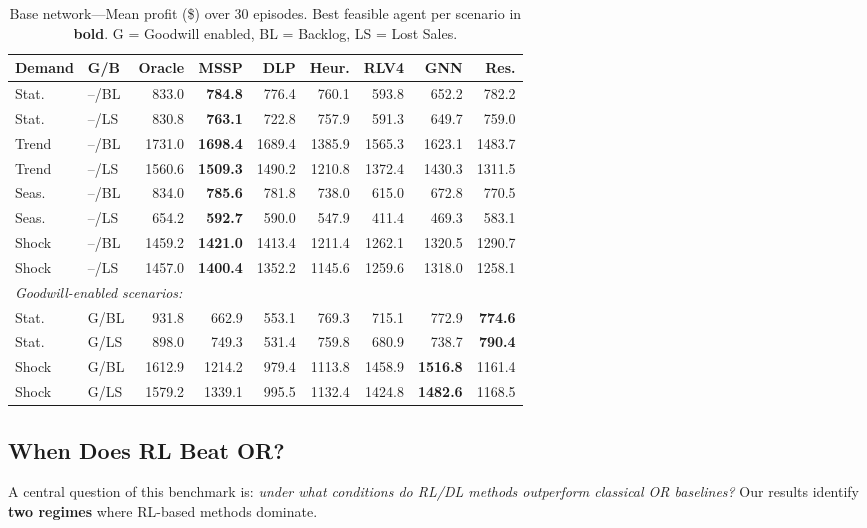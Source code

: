 \begin{table}[htbp]
\centering
\caption{Base network---Mean profit (\$) over 30 episodes. Best feasible
         agent per scenario in \textbf{bold}. G = Goodwill enabled,
         BL = Backlog, LS = Lost Sales.}
\label{tab:base_results}
\small
\begin{tabular}{ll rrrrrrr}
\toprule
\textbf{Demand} & \textbf{G/B}
  & \textbf{Oracle} & \textbf{MSSP} & \textbf{DLP} & \textbf{Heur.}
  & \textbf{RLV4} & \textbf{GNN} & \textbf{Res.} \\
\midrule
Stat. & --/BL & 833.0 & \textbf{784.8} & 776.4 & 760.1 & 593.8 & 652.2 & 782.2 \\
Stat. & --/LS & 830.8 & \textbf{763.1} & 722.8 & 757.9 & 591.3 & 649.7 & 759.0 \\
Trend & --/BL & 1731.0 & \textbf{1698.4} & 1689.4 & 1385.9 & 1565.3 & 1623.1 & 1483.7 \\
Trend & --/LS & 1560.6 & \textbf{1509.3} & 1490.2 & 1210.8 & 1372.4 & 1430.3 & 1311.5 \\
Seas. & --/BL & 834.0 & \textbf{785.6} & 781.8 & 738.0 & 615.0 & 672.8 & 770.5 \\
Seas. & --/LS & 654.2 & \textbf{592.7} & 590.0 & 547.9 & 411.4 & 469.3 & 583.1 \\
Shock & --/BL & 1459.2 & \textbf{1421.0} & 1413.4 & 1211.4 & 1262.1 & 1320.5 & 1290.7 \\
Shock & --/LS & 1457.0 & \textbf{1400.4} & 1352.2 & 1145.6 & 1259.6 & 1318.0 & 1258.1 \\
\midrule
\multicolumn{9}{l}{\emph{Goodwill-enabled scenarios:}} \\
Stat. & G/BL & 931.8 & 662.9 & 553.1 & 769.3 & 715.1 & 772.9 & \textbf{774.6} \\
Stat. & G/LS & 898.0 & 749.3 & 531.4 & 759.8 & 680.9 & 738.7 & \textbf{790.4} \\
Shock & G/BL & 1612.9 & 1214.2 & 979.4 & 1113.8 & 1458.9 & \textbf{1516.8} & 1161.4 \\
Shock & G/LS & 1579.2 & 1339.1 & 995.5 & 1132.4 & 1424.8 & \textbf{1482.6} & 1168.5 \\
\bottomrule
\end{tabular}
\end{table}

\subsection{When Does RL Beat OR?}\label{sec:rl_vs_or}

A central question of this benchmark is: \emph{under what conditions
do RL/DL methods outperform classical OR baselines?} Our results
identify \textbf{two regimes} where RL-based methods dominate.

